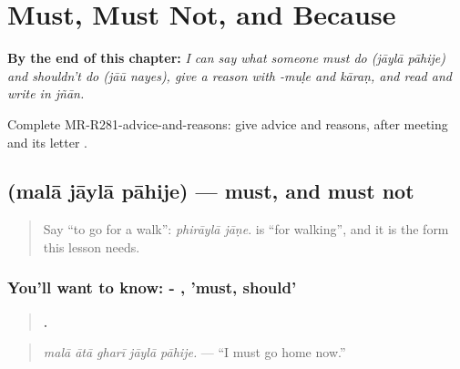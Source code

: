 
\chapter{Must, Must Not, and Because}
\label{ch:mr-must-must-not-and-because}

\begin{chapteropening}
\textbf{By the end of this chapter:} \emph{I can say what someone must do (jāylā pāhije) and shouldn't do (jāū nayes), give a reason with -muḷe and kāraṇ, and read and write  in jñān.}

Complete MR-R281-advice-and-reasons: give advice and reasons, after meeting  and its letter .
\end{chapteropening}

\section[\texorpdfstring{\mr{मला} \mr{जायला} \mr{पाहिजे} (malā jāylā pāhije)}{मला जायला पाहिजे (malā jāylā pāhije)}]{   (malā jāylā pāhije) — must, and must not}

\label{lesson:MR-C281-jayla-pahije}



\begin{quote}
Say \textquotedblleft{}to go for a walk\textquotedblright{}: \emph{phirāylā jāṇe}. \textbf{} is \textquotedblleft{}for walking\textquotedblright{}, and it is the form this lesson needs.
\end{quote}

\subsection*{You'll want to know: - , 'must, should'}
\begin{quote}
\textbf{    .}
\end{quote}

\begin{quote}
\emph{malā ātā gharī jāylā pāhije.} — \textquotedblleft{}I must go home now.\textquotedblright{}
\end{quote}

